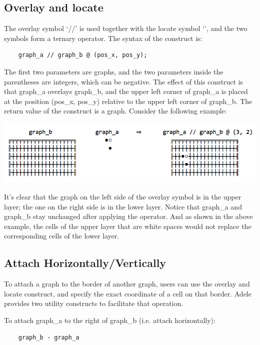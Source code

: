 \documentclass[11pt,letterpaper]{article}
\begin{document}
\subsection {Overlay and locate}

The overlay symbol ‘//’ is used together with the locate symbol ‘\@’, and the two symbols form a ternary operator. The syntax of the construct is:

\begin{lstlisting}
    graph_a // graph_b @ (pos_x, pos_y);
\end{lstlisting}

The first two parameters are graphs, and the two parameters inside the parentheses are integers, which can be negative. The effect of this construct is that graph\_a overlays graph\_b, and the upper left corner of graph\_a is placed at the position (pos\_x, pos\_y) relative to the upper left corner of graph\_b. The return value of the construct is a graph. Consider the following example:

\includegraphics[width=\textwidth]{./graph_01.png}

It's clear that the graph on the left side of the overlay symbol is in the upper layer; the one on the right side is in the lower layer. Notice that graph\_a and graph\_b stay unchanged after applying the operator. And as shown in the above example, the cells of the upper layer that are white spaces would not replace the corresponding cells of the lower layer.

\subsection {Attach Horizontally/Vertically}

To attach a graph to the border of another graph, users can use the overlay and locate construct, and specify the exact coordinate of a cell on that border. Adele provides two utility constructs to facilitate that operation.

To attach graph\_a to the right of graph\_b (i.e. attach horizontally):
\begin{lstlisting}
    graph_b - graph_a
\end{lstlisting}
\end{document}
